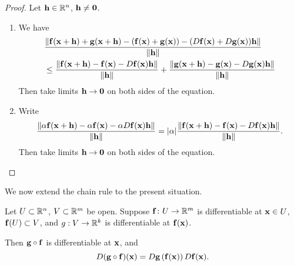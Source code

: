 \begin{proof}
Let $\vb{h}\in\mathbb R^n$, $\vb{h}\neq\vb{0}$.
\begin{enumerate}[label=(\roman*)]
\item We have
\begin{align*}
&\frac{\norm{\vb{f}(\vb{x}+\vb{h})+\vb{g}(\vb{x}+\vb{h})-(\vb{f}(\vb{x})+\vb{g}(\vb{x}))-(D\vb{f}(\vb{x})+D\vb{g}(\vb{x}))\vb{h}}}{\norm{\vb{h}}}\\
&\le\frac{\norm{\vb{f}(\vb{x}+\vb{h})-\vb{f}(\vb{x})-D\vb{f}(\vb{x})\vb{h}}}{\norm{\vb{h}}}+\frac{\norm{\vb{g}(\vb{x}+\vb{h})-\vb{g}(\vb{x})-D\vb{g}(\vb{x})\vb{h}}}{\norm{\vb{h}}}
\end{align*}
Then take limits $\vb{h}\to\vb{0}$ on both sides of the equation.

\item Write
\[\frac{\norm{\alpha\vb{f}(\vb{x}+\vb{h})-\alpha\vb{f}(\vb{x})-\alpha D\vb{f}(\vb{x})\vb{h}}}{\norm{\vb{h}}}=|\alpha|\frac{\norm{\vb{f}(\vb{x}+\vb{h})-\vb{f}(\vb{x})-D\vb{f}(\vb{x})\vb{h}}}{\norm{\vb{h}}}.\]
Then take limits $\vb{h}\to\vb{0}$ on both sides of the equation.
\end{enumerate}
\end{proof}

We now extend the chain rule to the present situation. 

\begin{lemma}
Let $U\subset\mathbb R^n$, $V\subset\mathbb R^m$ be open. Suppose $\vb{f}\colon U\to\mathbb R^m$ is differentiable at $\vb{x}\in U$, $\vb{f}(U)\subset V$, and $g:V\to\mathbb R^k$ is differentiable at $\vb{f}(\vb{x})$.

Then $\vb{g}\circ\vb{f}$ is differentiable at $\vb{x}$, and
\[D(\vb{g}\circ\vb{f})(\vb{x})=D\vb{g}\left(\vb{f}(\vb{x})\right)D\vb{f}(\vb{x}).\]
\end{lemma}

